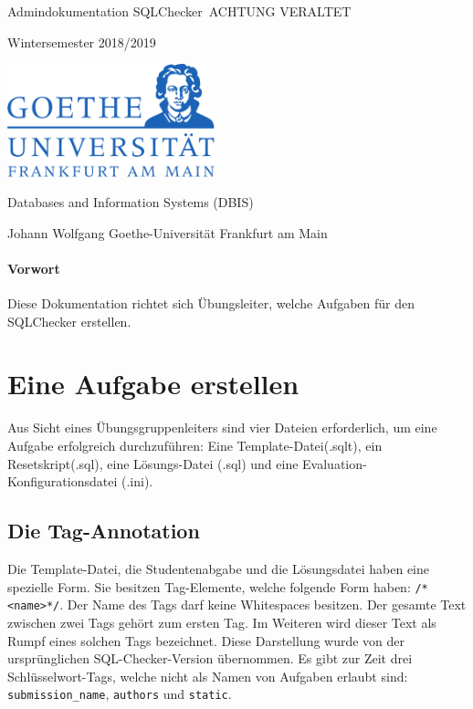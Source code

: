 \documentclass[11pt]{article}
\begin{document}
 \hypersetup{pageanchor=false}
\begin{titlepage}
	\begin{center}
		
		\vspace{6cm}

		{\huge Admindokumentation SQLChecker\ ACHTUNG VERALTET}

		{\small Wintersemester 2018/2019}
		\vspace{0.2cm}



		\vspace{2cm}
		\includegraphics[width=6cm]{title/goethe}
		\vspace{2.5cm}
		
		Databases and Information Systems (DBIS)
		
		Johann Wolfgang Goethe-Universität Frankfurt am Main
		
		
	\end{center}
	
\end{titlepage}
 \hypersetup{pageanchor=true}
 
\tableofcontents
 \newpage
\paragraph{Vorwort}
Diese Dokumentation richtet sich Übungsleiter, welche Aufgaben für den SQLChecker erstellen.

\section{Eine Aufgabe erstellen}
Aus Sicht eines Übungsgruppenleiters sind vier Dateien erforderlich, um eine Aufgabe erfolgreich durchzuführen: Eine Template-Datei(.sqlt), ein Resetskript(.sql), eine Lösungs-Datei (.sql) und eine Evaluation-Konfigurationsdatei (.ini). 

\subsection{Die Tag-Annotation}
Die Template-Datei, die Studentenabgabe und die Lösungsdatei haben eine spezielle Form. Sie besitzen Tag-Elemente, welche folgende Form haben: \texttt{/*<name>*/}. Der Name des Tags darf keine Whitespaces besitzen. Der gesamte Text zwischen zwei Tags gehört zum ersten Tag. Im Weiteren wird dieser Text als Rumpf eines solchen Tags bezeichnet. Diese Darstellung wurde von der ursprünglichen SQL-Checker-Version übernommen. Es gibt zur Zeit drei Schlüsselwort-Tags, welche nicht als Namen von Aufgaben erlaubt sind: \texttt{submission\_name}, \texttt{authors} und \texttt{static}.
\end{document}
